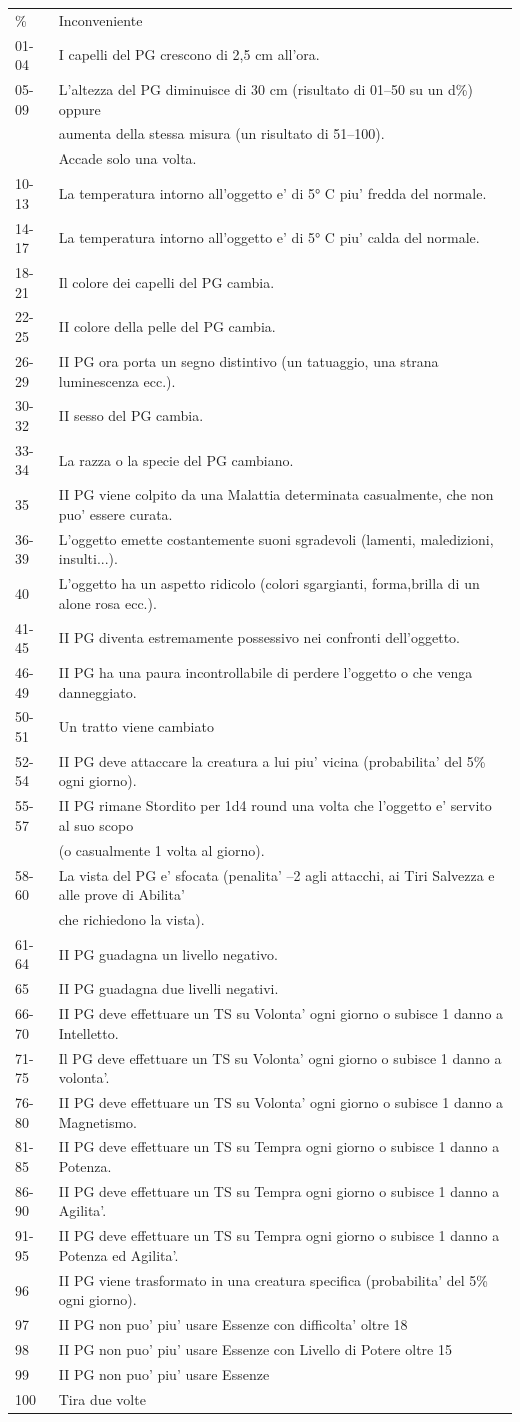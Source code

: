 \documentclass[a4paper,11pt,twoside,openany]{dndbook}
\begin{document}
{\begin{tabular}[c]{@{}ll@{}}
\toprule 
\% & Inconveniente\tabularnewline
01-04 & I capelli del PG crescono di 2,5 cm all'ora.\tabularnewline
05-09 & L'altezza del PG diminuisce di 30 cm (risultato di 01--50
su un d\%) oppure \\
&aumenta della stessa misura (un risultato di 51--100).\\
&Accade solo una volta.\tabularnewline
10-13 & La temperatura intorno all'oggetto e' di 5° C piu' fredda del normale.\tabularnewline
14-17 & La temperatura intorno all'oggetto e' di 5° C piu' calda del normale.\tabularnewline
18-21 & Il colore dei capelli del PG cambia.\tabularnewline
22-25 & II colore della pelle del PG cambia.\tabularnewline
26-29 & II PG ora porta un segno distintivo (un tatuaggio, una strana
luminescenza ecc.).\tabularnewline
30-32 & II sesso del PG cambia.\tabularnewline
33-34 & La razza o la specie del PG cambiano.\tabularnewline
35 & II PG viene colpito da una Malattia determinata casualmente,
che non puo' essere curata.\tabularnewline
36-39 & L'oggetto emette costantemente suoni sgradevoli (lamenti, maledizioni, insulti...).\tabularnewline
40 & L'oggetto ha un aspetto ridicolo (colori sgargianti, forma,brilla di un alone rosa ecc.).\tabularnewline
41-45 & II PG diventa estremamente possessivo nei confronti dell'oggetto.\tabularnewline
46-49 & II PG ha una paura incontrollabile di perdere l'oggetto o
che venga danneggiato.\tabularnewline
50-51 & Un tratto viene cambiato\tabularnewline
52-54 & II PG deve attaccare la creatura a lui piu' vicina (probabilita'
del 5\% ogni giorno).\tabularnewline
55-57 & II PG rimane Stordito per 1d4 round una volta che l'oggetto
e' servito al suo scopo\\
&(o casualmente 1 volta al giorno).\tabularnewline
58-60 & La vista del PG e' sfocata (penalita' --2 agli attacchi,
ai Tiri Salvezza e alle prove di Abilita'\\
&che richiedono la vista).\tabularnewline
61-64 & II PG guadagna un livello negativo.\tabularnewline
65 & II PG guadagna due livelli negativi.\tabularnewline
66-70 & II PG deve effettuare un TS su Volonta' ogni giorno
o subisce 1 danno a Intelletto.\tabularnewline
71-75 & Il PG deve effettuare un TS su Volonta' ogni giorno
o subisce 1 danno a volonta'.\tabularnewline
76-80 & II PG deve effettuare un TS su Volonta' ogni giorno
o subisce 1 danno a Magnetismo.\tabularnewline
81-85 & II PG deve effettuare un TS su Tempra ogni giorno
o subisce 1 danno a Potenza.\tabularnewline
86-90 & II PG deve effettuare un TS su Tempra ogni giorno
o subisce 1 danno a Agilita'.\tabularnewline
91-95 & II PG deve effettuare un TS su Tempra ogni giorno
o subisce 1 danno a Potenza ed Agilita'.\tabularnewline
96 & II PG viene trasformato in una creatura specifica (probabilita'
del 5\% ogni giorno).\tabularnewline
97 & II PG non puo' piu' usare Essenze con difficolta' oltre 18\tabularnewline
98 & II PG non puo' piu' usare Essenze con Livello di Potere oltre
15\tabularnewline
99 & II PG non puo' piu' usare Essenze\tabularnewline
100 & Tira due volte\tabularnewline
\bottomrule
\end{tabular}

}
\end{document}
